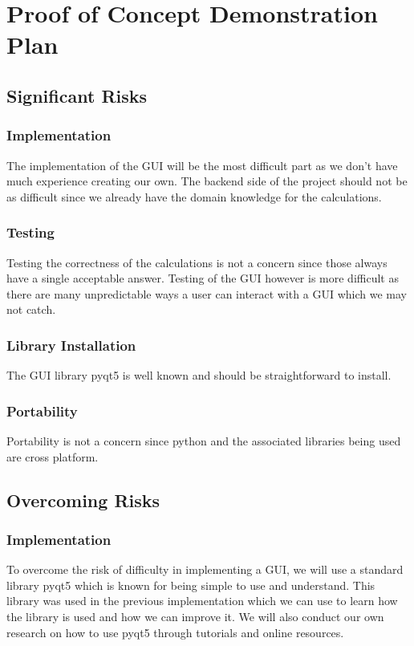 \documentclass{article}
\begin{document}
\section{Proof of Concept Demonstration Plan}
\subsection{Significant Risks}
\subsubsection{Implementation}
The implementation of the GUI will be the most difficult part as we don’t have much experience creating our own. The backend side of the project should not be as difficult since we already have the domain knowledge for the calculations.

\subsubsection{Testing}
Testing the correctness of the calculations is not a concern since those always have a single acceptable answer. Testing of the GUI however is more difficult as there are many unpredictable ways a user can interact with a GUI which we may not catch.

\subsubsection{Library Installation}
The GUI library pyqt5 is well known and should be straightforward to install.

\subsubsection{Portability}
Portability is not a concern since python and the associated libraries being used are cross platform.


\subsection{Overcoming Risks}
\subsubsection{Implementation}
To overcome the risk of difficulty in implementing a GUI, we will use a standard library pyqt5 which is known for being simple to use and understand. This library was used in the previous implementation which we can use to learn how the library is used and how we can improve it. We will also conduct our own research on how to use pyqt5 through tutorials and online resources.
\end{document}

